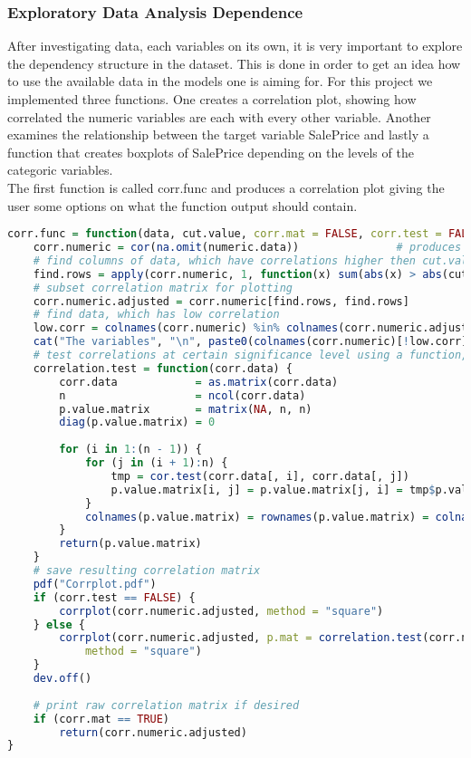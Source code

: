\subsubsection{Exploratory Data Analysis Dependence}
After investigating data, each variables on its own, it is very important to explore the dependency structure in the dataset. This is done in order to get an idea how to use the available data in the models one is aiming for. For this project we implemented three functions. One creates a correlation plot, showing how correlated the numeric variables are each with every other variable. Another examines the relationship between the target variable SalePrice and lastly a function that creates boxplots of SalePrice depending on the levels of the categoric variables. \\
The first function is called corr.func and produces a correlation  plot giving the user some options on what the function output should contain.
\begin{lstlisting}[language=R]
corr.func = function(data, cut.value, corr.mat = FALSE, corr.test = FALSE, significance = 0.05) {
    corr.numeric = cor(na.omit(numeric.data))               # produces correlation matrix of all numeric variables in the dataset
    # find columns of data, which have correlations higher then cut.value
    find.rows = apply(corr.numeric, 1, function(x) sum(abs(x) > abs(cut.value)) > 1)
    # subset correlation matrix for plotting
    corr.numeric.adjusted = corr.numeric[find.rows, find.rows]
    # find data, which has low correlation
    low.corr = colnames(corr.numeric) %in% colnames(corr.numeric.adjusted)
    cat("The variables", "\n", paste0(colnames(corr.numeric)[!low.corr], collapse = ", "), "\n", "have very low bivariate correlations with the other numeric variables in the training data set!")
    # test correlations at certain significance level using a function, that produces a p-value matrix for all bivariate correlations
    correlation.test = function(corr.data) {
        corr.data            = as.matrix(corr.data)
        n                    = ncol(corr.data)
        p.value.matrix       = matrix(NA, n, n)
        diag(p.value.matrix) = 0
        
        for (i in 1:(n - 1)) {
            for (j in (i + 1):n) {
                tmp = cor.test(corr.data[, i], corr.data[, j])            # testing correlation
                p.value.matrix[i, j] = p.value.matrix[j, i] = tmp$p.value # filling p-value matrix with respective p-values
            }
            colnames(p.value.matrix) = rownames(p.value.matrix) = colnames(corr.numeric.adjusted)
        }
        return(p.value.matrix)
    }
    # save resulting correlation matrix
    pdf("Corrplot.pdf")
    if (corr.test == FALSE) {
        corrplot(corr.numeric.adjusted, method = "square")
    } else {
        corrplot(corr.numeric.adjusted, p.mat = correlation.test(corr.numeric.adjusted), sig.level = significance, 
            method = "square")
    }
    dev.off()
    
    # print raw correlation matrix if desired
    if (corr.mat == TRUE) 
        return(corr.numeric.adjusted)
}
\end{lstlisting}

